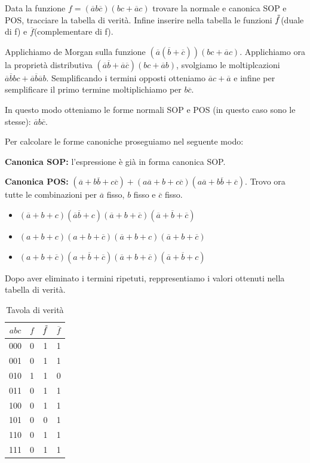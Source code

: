 \begin{exercise}
    Data la funzione $f=(\overline{a}b\overline{c})(bc+\overline{a}c)$ trovare la normale e canonica SOP e POS, tracciare la tabella di verità. Infine inserire nella tabella le funzioni $\Tilde{f}$(duale di f) e $\overline{f}$(complementare di f).
    
    Applichiamo de Morgan sulla funzione $(\overline{a}(\overline{b}+\overline{c}))(bc+\overline{a}c)$. Applichiamo ora la proprietà distributiva $(\overline{a}\overline{b}+\overline{a}\overline{c})(bc+\overline{a}b)$, svolgiamo le moltiplcazioni $\overline{a}\overline{b}bc+\overline{a}\overline{b}\overline{a}b$. Semplificando i termini opposti otteniamo $\overline{a}c+\overline{a}$ e infine per semplificare il primo termine moltiplichiamo per $b\overline{c}$.
    
    In questo modo otteniamo le forme normali SOP e POS (in questo caso sono le stesse): $\overline{a}b\overline{c}$.
    
    Per calcolare le forme canoniche proseguiamo nel seguente modo:
    
    \textbf{Canonica SOP:} l'espressione è già in forma canonica SOP.
    
    \textbf{Canonica POS:} $(\overline{a}+b\overline{b}+c\overline{c})+(a\overline{a}+b+c\overline{c})(a\overline{a}+b\overline{b}+\overline{c})$.
    Trovo ora tutte le combinazioni per $\overline{a}$ fisso, $b$ fisso e $\overline{c}$ fisso.
    \begin{itemize}
        \item[$\overline{a}$:] $(\overline{a}+b+c)(\overline{a}\overline{b}+c)(\overline{a}+b+\overline{c})(\overline{a}+\overline{b}+\overline{c})$
        \item[$b$:] $(a+b+c)(a+b+\overline{c})(\overline{a}+b+c)(\overline{a}+b+\overline{c})$
        \item[$\overline{c}$:] $(a+b+\overline{c})(a+\overline{b}+\overline{c})(\overline{a}+b+\overline{c})(\overline{a}+\overline{b}+c)$
    \end{itemize}
    
    Dopo aver eliminato i termini ripetuti, reppresentiamo i valori ottenuti nella tabella di verità.
    \begin{table}[ht]
        \centering
        \begin{tabular}{|c|c|c|c|}
             \hline$abc$ & $f$ & $\Tilde{f}$ & $\overline{f}$ \\\hline\hline
             000 & 0 & 1 & 1\\
             001 & 0 & 1 & 1\\
             010 & 1 & 1 & 0\\
             011 & 0 & 1 & 1\\\hline
             100 & 0 & 1 & 1\\
             101 & 0 & 0 & 1\\
             110 & 0 & 1 & 1\\
             111 & 0 & 1 & 1\\\hline
        \end{tabular}
        \caption{Tavola di verità}
    \end{table}
    

\end{exercise}
